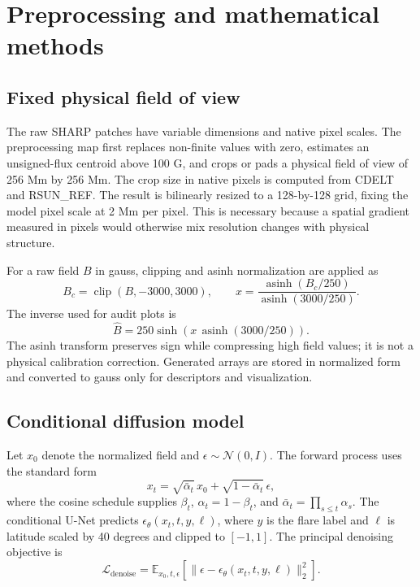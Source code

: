 \documentclass[11pt,oneside]{report}
\begin{document}
\chapter{Preprocessing and mathematical methods}

\section{Fixed physical field of view}

The raw SHARP patches have variable dimensions and native pixel scales. The preprocessing map first replaces non-finite values with zero, estimates an unsigned-flux centroid above 100 G, and crops or pads a physical field of view of 256 Mm by 256 Mm. The crop size in native pixels is computed from CDELT and RSUN\_REF. The result is bilinearly resized to a 128-by-128 grid, fixing the model pixel scale at 2 Mm per pixel. This is necessary because a spatial gradient measured in pixels would otherwise mix resolution changes with physical structure.

For a raw field $B$ in gauss, clipping and asinh normalization are applied as
\begin{equation}
  B_c = \operatorname{clip}(B,-3000,3000), \qquad
  x = \frac{\operatorname{asinh}(B_c/250)}{\operatorname{asinh}(3000/250)}.
\end{equation}
The inverse used for audit plots is
\begin{equation}
  \widehat{B} = 250\sinh\left(x\,\operatorname{asinh}(3000/250)\right).
\end{equation}
The asinh transform preserves sign while compressing high field values; it is not a physical calibration correction. Generated arrays are stored in normalized form and converted to gauss only for descriptors and visualization.

\section{Conditional diffusion model}

Let $x_0$ denote the normalized field and $\epsilon\sim\mathcal{N}(0,I)$. The forward process uses the standard form
\begin{equation}
  x_t = \sqrt{\bar\alpha_t}\,x_0 + \sqrt{1-\bar\alpha_t}\,\epsilon,
\end{equation}
where the cosine schedule supplies $\beta_t$, $\alpha_t=1-\beta_t$, and $\bar\alpha_t=\prod_{s\leq t}\alpha_s$. The conditional U-Net predicts $\epsilon_\theta(x_t,t,y,\ell)$, where $y$ is the flare label and $\ell$ is latitude scaled by 40 degrees and clipped to $[-1,1]$. The principal denoising objective is
\begin{equation}
  \mathcal{L}_{\mathrm{denoise}} = \mathbb{E}_{x_0,t,\epsilon}\left[\|\epsilon-\epsilon_\theta(x_t,t,y,\ell)\|_2^2\right].
\end{equation}
\end{document}
